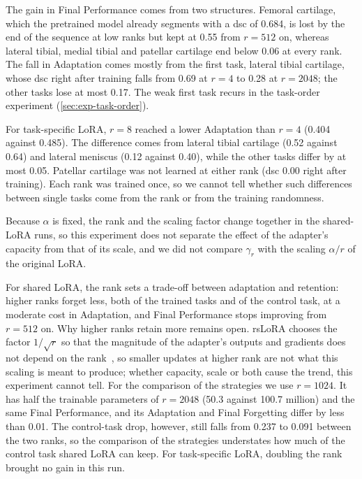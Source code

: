 The gain in Final Performance comes from two structures.
Femoral cartilage, which the pretrained model already segments with a \gls{dsc} of 0.684, is lost by the end of the sequence at low ranks but kept at 0.55 from $r = 512$ on, whereas lateral tibial, medial tibial and patellar cartilage end below 0.06 at every rank.
The fall in Adaptation comes mostly from the first task, lateral tibial cartilage, whose \gls{dsc} right after training falls from 0.69 at $r = 4$ to 0.28 at $r = 2048$; the other tasks lose at most 0.17.
The weak first task recurs in the task-order experiment (\cref{sec:exp-task-order}).

For task-specific LoRA, $r = 8$ reached a lower Adaptation than $r = 4$ (0.404 against 0.485).
The difference comes from lateral tibial cartilage (0.52 against 0.64) and lateral meniscus (0.12 against 0.40), while the other tasks differ by at most 0.05.
Patellar cartilage was not learned at either rank (\gls{dsc} 0.00 right after training).
Each rank was trained once, so we cannot tell whether such differences between single tasks come from the rank or from the training randomness.

Because $\alpha$ is fixed, the rank and the scaling factor change together in the shared-LoRA runs, so this experiment does not separate the effect of the adapter's capacity from that of its scale, and we did not compare $\gamma_r$ with the scaling $\alpha / r$ of the original LoRA.

For shared LoRA, the rank sets a trade-off between adaptation and retention: higher ranks forget less, both of the trained tasks and of the control task, at a moderate cost in Adaptation, and Final Performance stops improving from $r = 512$ on.
Why higher ranks retain more remains open.
rsLoRA chooses the factor $1/\sqrt{r}$ so that the magnitude of the adapter's outputs and gradients does not depend on the rank~\cite[Sec.~3]{kalajdzievski2023rankstabilizationscalingfactor}, so smaller updates at higher rank are not what this scaling is meant to produce; whether capacity, scale or both cause the trend, this experiment cannot tell.
For the comparison of the strategies we use $r = 1024$.
It has half the trainable parameters of $r = 2048$ (50.3 against 100.7 million) and the same Final Performance, and its Adaptation and Final Forgetting differ by less than 0.01.
The control-task drop, however, still falls from 0.237 to 0.091 between the two ranks, so the comparison of the strategies understates how much of the control task shared LoRA can keep.
For task-specific LoRA, doubling the rank brought no gain in this run.

